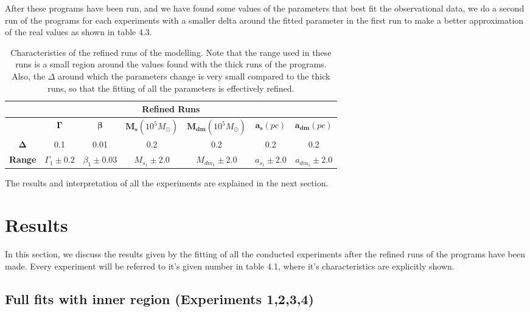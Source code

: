 After these programs have been run, and we have found some values of the parameters that best fit the observational data, we do a second run of the programs for each experiments with a smaller delta around the fitted parameter in the first run to make a better approximation of the real values as shown in table 4.3.

\begin{table}[H]
\centering
\label{my-label}
\begin{tabular}{|c|c|c|c|c|c|c|}
\hline
\multicolumn{7}{|c|}{\textbf{Refined Runs}}                                                                          \\ \hline
               & \textbf{$\mathbf{\Gamma}$} & \textbf{$\mathbf{\beta}$} & \textbf{$\mathbf{M_{s}}(10^{5} M_{\odot})$} & \textbf{$\mathbf{M_{dm}}(10^{5} M_{\odot})$} & \textbf{$\mathbf{a_{s}}(pc)$} & \textbf{$\mathbf{a_{dm}}(pc)$} \\ \hline
\textbf{$\mathbf{\Delta}$}  &  0.1 &  0.01     &  0.2    &  0.2   &  0.2    &  0.2          \\ \hline
\textbf{Range} & $\Gamma_{1}\pm 0.2$   & $\beta_{1}\pm 0.03$        & $M_{s}_{1}\pm 2.0$      & $M_{dm}_{1}\pm 2.0$   & $a_{s}_{1}\pm 2.0$      & $a_{dm}_{1}\pm 2.0$            \\ \hline
\end{tabular}
\caption[Characteristics of the refined runs of the modelling]{Characteristics of the refined runs of the modelling. Note that the range used in these runs is a small region around the values found with the thick runs of the programs. Also, the $\Delta$ around which the parameters change is very small compared to the thick runs, so that the fitting of all the parameters is effectively refined.}
\end{table}

The results and interpretation of all the experiments are explained in the next section.

\section{Results}

In this section, we discuss the results given by the fitting of all the conducted experiments after the refined runs of the programs have been made. Every experiment will be referred to it's given number in table 4.1, where it's characteristics are explicitly shown.

\subsection{Full fits with inner region (Experiments 1,2,3,4)}

